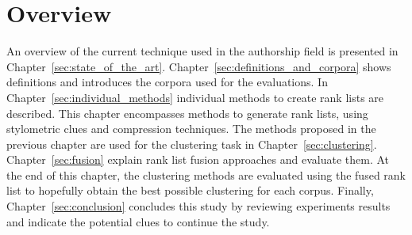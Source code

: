 \section{Overview}

An overview of the current technique used in the authorship field is presented in Chapter~\ref{sec:state_of_the_art}.
Chapter~\ref{sec:definitions_and_corpora} shows definitions and introduces the corpora used for the evaluations.
In Chapter~\ref{sec:individual_methods} individual methods to create rank lists are described.
This chapter encompasses methods to generate rank lists, using stylometric clues and compression techniques.
The methods proposed in the previous chapter are used for the clustering task in Chapter~\ref{sec:clustering}.
Chapter~\ref{sec:fusion} explain rank list fusion approaches and evaluate them.
At the end of this chapter, the clustering methods are evaluated using the fused rank list to hopefully obtain the best possible clustering for each corpus.
Finally, Chapter~\ref{sec:conclusion} concludes this study by reviewing experiments results and indicate the potential clues to continue the study.
